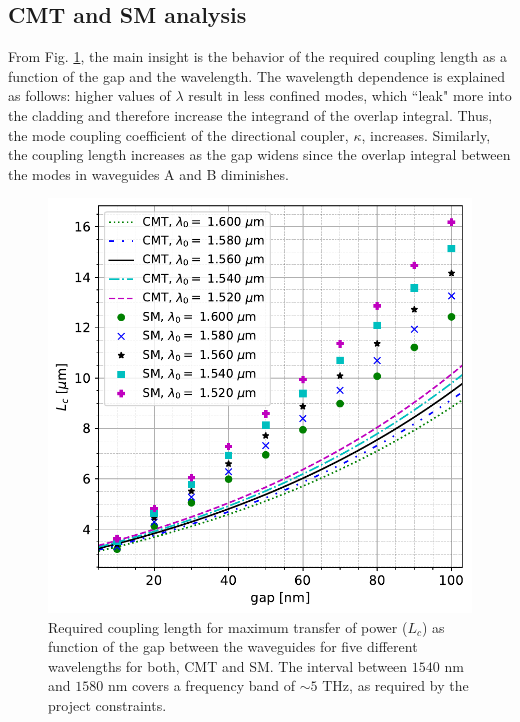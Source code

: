 \documentclass[conference]{IEEEtran}
\begin{document}
\subsection{CMT and SM analysis}
From Fig. \ref{fig:Lc_vs_gap}, the main insight is the behavior of the required coupling length as a function of the gap and the wavelength. The wavelength dependence is explained as follows: higher values of $\lambda$ result in less confined modes, which ``leak" more into the cladding and therefore increase the integrand of the overlap integral. Thus, the mode coupling coefficient of the directional coupler, $\kappa$, increases. Similarly, the coupling length increases as the gap widens since the overlap integral between the modes in waveguides A and B diminishes. 

\begin{figure}[ht]
\centerline{\includegraphics[width=0.85\linewidth]{projeto2/figs/Lc_vs_gap__sweep_freq__cmt_vs_sm.pdf}}
\caption{Required coupling length for maximum transfer of power ($L_c$) as function of the gap between the waveguides for five different wavelengths for both, CMT and SM. The interval between $1540$ nm and $1580$ nm covers a frequency band of $\sim 5$ THz, as required by the project constraints.}
\label{fig:Lc_vs_gap}
\end{figure}
\end{document}
